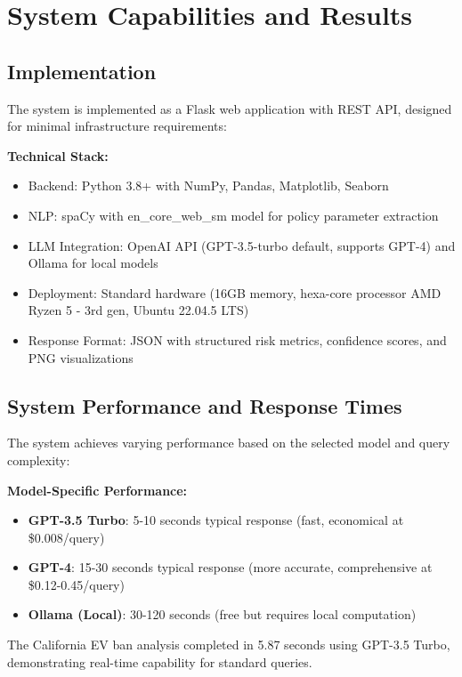 \documentclass[conference]{IEEEtran}
\begin{document}
\section{System Capabilities and Results}

\subsection{Implementation}

The system is implemented as a Flask web application with REST API, designed for minimal infrastructure requirements:

\textbf{Technical Stack:}
\begin{itemize}
\item Backend: Python 3.8+ with NumPy, Pandas, Matplotlib, Seaborn
\item NLP: spaCy with en\_core\_web\_sm model for policy parameter extraction
\item LLM Integration: OpenAI API (GPT-3.5-turbo default, supports GPT-4) and Ollama for local models
\item Deployment: Standard hardware (16GB memory, hexa-core processor AMD Ryzen 5 - 3rd gen, Ubuntu 22.04.5 LTS)
\item Response Format: JSON with structured risk metrics, confidence scores, and PNG visualizations
\end{itemize}

\subsection{System Performance and Response Times}

The system achieves varying performance based on the selected model and query complexity:

\textbf{Model-Specific Performance:}
\begin{itemize}
\item \textbf{GPT-3.5 Turbo}: 5-10 seconds typical response (fast, economical at \$0.008/query)
\item \textbf{GPT-4}: 15-30 seconds typical response (more accurate, comprehensive at \$0.12-0.45/query)
\item \textbf{Ollama (Local)}: 30-120 seconds (free but requires local computation)
\end{itemize}

The California EV ban analysis completed in 5.87 seconds using GPT-3.5 Turbo, demonstrating real-time capability for standard queries.
\end{document}
